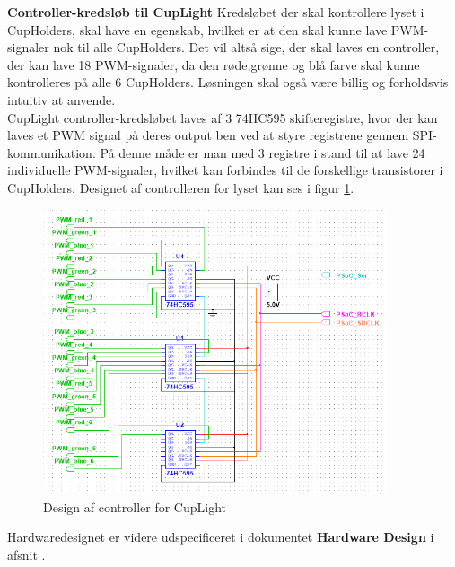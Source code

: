 \documentclass[Rapport/Rapport_main.tex]{subfiles}
\begin{document}
\textbf{Controller-kredsløb til CupLight}
Kredsløbet der skal kontrollere lyset i CupHolders, skal have en egenskab, hvilket er at den skal kunne lave PWM-signaler nok til alle CupHolders. Det vil altså sige, der skal laves en controller, der kan lave 18 PWM-signaler, da den røde,grønne og blå farve skal kunne kontrolleres på alle 6 CupHolders. Løsningen skal også være billig og forholdsvis intuitiv at anvende.\\
CupLight controller-kredsløbet laves af 3 74HC595 skifteregistre\cite{datasheet_shiftreg}, hvor der kan laves et PWM signal på deres output ben ved at styre registrene gennem SPI-kommunikation. På denne måde er man med 3 registre i stand til at lave 24 individuelle PWM-signaler, hvilket kan forbindes til de forskellige transistorer i CupHolders. Designet af controlleren for lyset kan ses i figur \ref{fig:rap_cuplight_controller}.
\begin{figure}[H]
    \centering
    \includegraphics[width=0.9\textwidth]{HardwareDesign/CupLight/graphics/CupLight_HW_Controller.png}
    \caption{Design af controller for CupLight}
    \label{fig:rap_cuplight_controller}
\end{figure}
Hardwaredesignet er videre udspecificeret i dokumentet \textbf{Hardware Design} i afsnit .
\end{document}
